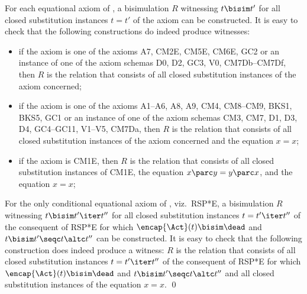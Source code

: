 \documentclass[runningheads]{llncs}
\begin{document}
For each equational axiom of \deACPei, a bisimulation $R$ witnessing 
$t \bisim t'$ for all closed substitution instances $t = t'$ of the 
axiom can be constructed.
It is easy to check that the following constructions do indeed produce 
witnesses:
\begin{itemize}
\item
if the axiom is one of the axioms A7, CM2E, CM5E, CM6E, GC2 or an 
instance of one of the axiom schemas D0, D2, GC3, V0, CM7Db--CM7Df, 
then $R$ is the relation that consists of all closed substitution 
instances of the axiom concerned;
\item
if the axiom is one of the axioms A1--A6, A8, A9, CM4, CM8--CM9, 
BKS1, BKS5, GC1 or an instance of one of the axiom schemas CM3, CM7, D1, 
D3, D4, GC4--GC11, V1--V5, CM7Da, then $R$ is the relation that consists 
of all closed substitution instances of the axiom concerned and the 
equation $x = x$;
\item
if the axiom is CM1E, then $R$ is the relation that consists of all 
closed substitution instances of CM1E, the equation 
$x \parc y = y \parc x$, and the equation $x = x$;
\end{itemize}
For the only conditional equational axiom of \deACPei, viz.\ RSP*E, a 
bisimulation $R$ witnessing $t \bisim t' \iter t''$ for all closed 
substitution instances $t = t' \iter t''$ of the consequent of RSP*E for 
which $\encap{\Act}(t) \bisim \dead$ and 
$t \bisim t' \seqc t \altc t''$ can be constructed.
It is easy to check that the following construction does indeed produce 
a witness: $R$ is the relation that consists of all closed substitution 
instances $t = t' \iter t''$ of the consequent of RSP*E for which 
$\encap{\Act}(t) \bisim \dead$ and $t \bisim t' \seqc t \altc t''$ 
and all closed substitution instances of the equation $x = x$. 
\qed





\begin{comment}
The term $\encap{\Act}\!(x) \seqc \encap{\Act}\!(y)$ occurring in axiom 
CM1E is needed to handle successful termination in the presence of 
$\ep$: it stands for the process that behaves the same as $\ep$ if both 
$x$ and $y$ stand for a process that has the option to behave the same 
as $\ep$ and it stands for the process that behaves the same as $\dead$ 
otherwise.
In~\cite[Section~5.3]{BW90}, the symbol $\surd$ is used instead of 
$\encap{\Act}$.
\end{comment}
\end{document}

